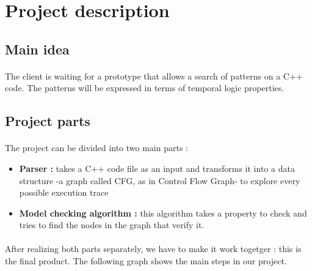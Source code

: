 \documentclass{report}
\begin{document}
\section{Project description}

\subsection{Main idea}

\paragraph{}
\hspace{4mm}\textnormal{The client is waiting for a prototype that allows a search of patterns on a C++ code. The patterns will be expressed in terms of temporal logic properties.}

\subsection{Project parts}

\paragraph{}
\hspace{4mm}\textnormal{The project can be divided into two main parts :}

\vspace{3mm}
\begin{itemize}
\item \textbf{Parser :} takes a C++ code file as an input and transforms it into a data structure -a graph called CFG, as in Control Flow Graph- to explore every possible execution trace\vspace{1mm}
\item \textbf{Model checking algorithm :} this algorithm takes a property to check and tries to find the nodes in the graph that verify it.\vspace{1mm}
\end{itemize}

\paragraph{}
\hspace{4mm}\textnormal{After realizing both parts separately, we have to make it work togetger : this is the final product.
The following graph shows the main steps in our project.}
\end{document}
